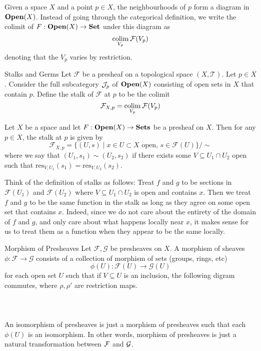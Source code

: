 \documentclass[a4paper]{article}
\begin{document}
Given a space $X$ and a point $p\in X$, the neighbourhoods of $p$ form a diagram in $\bold{Open}(X)$. Instead of going through the categorical definition, we write the colimit of $F:\bold{Open}(X)\to\bold{Set}$ under this diagram as $$\operatorname*{colim}_{V_p}\mathcal{F}(V_p)$$ denoting that the $V_p$ varies by restriction. 

\begin{defn}{Stalks and Germs}{} Let $\mathcal{F}$ be a presheaf on a topological space $(X,\mathcal{T})$. Let $p\in X$. Consider the full subcategory $\mathcal{J}_p$ of $\bold{Open}(X)$ consisting of open sets in $X$ that contain $p$. Define the stalk of $\mathcal{F}$ at $p$ to be the colimit $$\mathcal{F}_{X,p}=\operatorname*{colim}_{V_p}\mathcal{F}(V_p)$$ 
\end{defn}

\begin{lmm}{}{} Let $X$ be a space and let $F:\bold{Open}(X)\to\bold{Sets}$ be a presheaf on $X$. Then for any $p\in X$, the stalk at $p$ is given by $$\mathcal{F}_{X,p}=\{(U,s)\;|\;x\in U\subset X\text{ open, }s\in\mathcal{F}(U)\}/\sim$$ where we say that $(U_1,s_1)\sim(U_2,s_2)$ if there exists some $V\subseteq U_1\cap U_2$ open such that $\text{res}_{V,U_1}(s_1)=\text{res}_{V,U_2}(s_2)$. 
\end{lmm}

Think of the definition of stalks as follows: Treat $f$ and $g$ to be sections in $\mathcal{F}(U_1)$ and $\mathcal{F}(U_2)$ where $V\subseteq U_1\cap U_2$ is open and contains $x$. Then we treat $f$ and $g$ to be the same function in the stalk as long as they agree on some open set that contains $x$. Indeed, since we do not care about the entirety of the domain of $f$ and $g$, and only care about what happens locally near $x$, it makes sense for us to treat them as a function when they appear to be the same locally. 

\begin{defn}{Morphism of Presheaves}{} Let $\mathcal{F},\mathcal{G}$ be presheaves on $X$. A morphism of sheaves $\phi:\mathcal{F}\to\mathcal{G}$ consists of a collection of morphism of sets (groups, rings, etc) $$\phi(U):\mathcal{F}(U)\to\mathcal{G}(U)$$ for each open set $U$ such that if $V\subseteq U$ is an inclusion, the following digram commutes, where $\rho,\rho'$ are restriction maps. \\~\\
 \\~\\
An isomorphism of presheaves is just a morphism of presheaves such that each $\phi(U)$ is an isomorphism. In other words, morphism of presheaves is just a natural transformation between $\mathcal{F}$ and $\mathcal{G}$.  
\end{defn}
\end{document}
